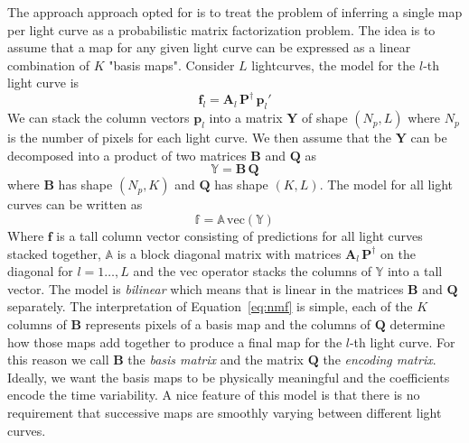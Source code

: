 \documentclass[modern]{aastex62}
\begin{document}
The approach approach opted for is to treat the problem of inferring a single map per light curve as a probabilistic matrix factorization problem.
The idea is to assume that a map for any given light curve can be expressed as a linear combination of $K$ "basis maps".
Consider $L$ lightcurves, the model for the $l$-th light curve is
\begin{equation}
    \mathbf{f}_l=\mathbf{A}_l\,\mathbf{P}^\dagger\,\mathbf{p}_l'
\end{equation}
We can stack the column vectors $\mathbf{p}_l$ into a matrix $\mathbf{Y}$ of shape $(N_p, L)$ where $N_p$ is the number of pixels for each light curve.
We then assume that the $\mathbf{Y}$ can be decomposed into a product of two matrices $\mathbf{B}$ and $\mathbf{Q}$ as
\begin{equation}
    \mathbb{Y}=\mathbf{B}\,\mathbf{Q}
    \label{eq:nmf}
\end{equation}
where $\mathbf{B}$ has shape $(N_p, K)$ and $\mathbf{Q}$ has shape $(K, L)$.
The model for all light curves can be written as
\begin{equation}
    \mathbb{f}=\mathbb{A}\,\mathrm{vec}(\mathbf{\mathbb{Y}})
    \label{eq:model_all_lcs}
\end{equation}
Where $\mathbf{f}$ is a tall column vector consisting of predictions for all light curves stacked together, $\mathbb{A}$ is a block diagonal matrix with matrices $\mathbf{A}_l\,\mathbf{P}^\dagger$ on the diagonal for $l=1\dots, L$ and the $\mathrm{vec}$ operator stacks the columns of $\mathbb{Y}$ into a tall vector.
The model is \emph{bilinear} which means that is linear in the matrices $\mathbf{B}$ and $\mathbf{Q}$ separately.
The interpretation of Equation~\ref{eq:nmf} is simple, each of the $K$ columns of $\mathbf{B}$ represents pixels of a basis map and the columns of $\mathbf{Q}$ determine how those maps add together to produce a final map for the $l$-th light curve.
For this reason we call $\mathbf{B}$ the \emph{basis matrix} and the matrix $\mathbf{Q}$ the \emph{encoding matrix}.
Ideally, we want the basis maps to be physically meaningful and the coefficients encode the time variability.
A nice feature of this model is that there is no requirement that successive maps are smoothly varying between different light curves.
\end{document}
